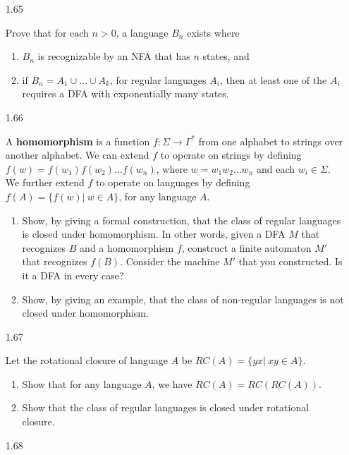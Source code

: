 \begin{enumerate}
      \item [1.65]

            Prove that for each $n > 0$, a language $B_n$ exists where
            \begin{enumerate}
                  \item $B_n$ is recognizable by an NFA that has $n$ states, and
                  \item if $B_n = A_1 \cup \ldots \cup A_k$, for regular languages $A_i$, then at least one of the $A_i$ requires a DFA with exponentially many states.
            \end{enumerate}

      \item [1.66]

            A \textbf{homomorphism} is a function $f: \Sigma \longrightarrow \Gamma^\ast$ from one alphabet to strings over another alphabet. We can extend $f$ to operate on strings by defining $f(w)= f(w_1)f(w_2) \ldots f(w_n)$, where $w = w_1 w_2 \ldots w_n$ and each $w_i \in \Sigma$. We further extend $f$ to operate on languages by defining $f(A)=\{f(w)|~ w \in A\}$, for any language $A$.

            \begin{enumerate}
                  \item Show, by giving a formal construction, that the class of regular languages is closed under homomorphism. In other words, given a DFA $M$ that recognizes $B$ and a homomorphism $f$, construct a finite automaton $M'$ that recognizes $f(B)$. Consider the machine $M'$ that you constructed. Is it a DFA in every case?
                  \item Show, by giving an example, that the class of non-regular languages is not closed under homomorphism.
            \end{enumerate}

      \item [1.67]

            Let the rotational closure of language $A$ be $RC(A)=\{yx|~ xy \in A\}$.
            \begin{enumerate}
                  \item Show that for any language $A$, we have $RC(A)=RC(RC(A))$.
                  \item Show that the class of regular languages is closed under rotational closure.
            \end{enumerate}

      \item [1.68]


\end{enumerate}
